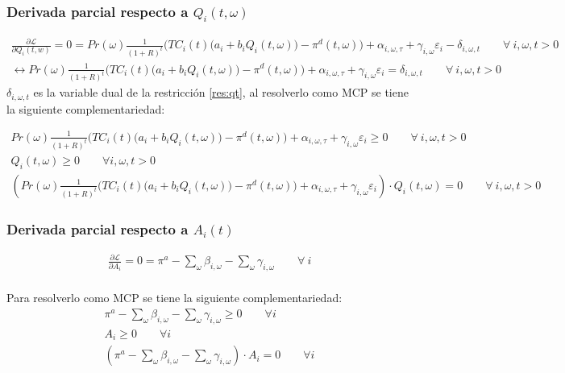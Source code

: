 \subsubsection{Derivada parcial respecto a $Q_i(t,\omega)$}
\footnotesize{
\begin{align}
   \frac{\partial \mathcal{L} }{\partial Q_i(t,w)}= 
   0= Pr(\omega)  \frac{1}{(1+R)^t} \bigg( TC_i(t) \big(a_{i}+b_i Q_i(t,\omega)\big ) -\pi^d(t,\omega) \bigg) + \alpha_{i,\omega,\tau} + \gamma_{i,\omega} \varepsilon_{i} -\delta_{i,\omega,t} \qquad  \forall \ i, \omega, t > 0\\
   \leftrightarrow Pr(\omega)  \frac{1}{(1+R)^t} \bigg( TC_i(t) \big(a_{i}+b_i Q_i(t,\omega)\big ) -\pi^d(t,\omega) \bigg) + \alpha_{i,\omega,\tau} + \gamma_{i,\omega} \varepsilon_{i}= \delta_{i,\omega,t} \qquad \forall \ i, \omega, t > 0
\end{align}
}
$\delta_{i,\omega,t}$ es la variable dual de la restricción \ref{res:qt}, al resolverlo como MCP se tiene la siguiente complementariedad:

\footnotesize{
\begin{align}
    Pr(\omega)  \frac{1}{(1+R)^t} \bigg( TC_i(t) \big(a_{i}+b_i Q_i(t,\omega)\big ) -\pi^d(t,\omega) \bigg) + \alpha_{i,\omega,\tau} + \gamma_{i,\omega} \varepsilon_{i} \geq 0 \qquad \forall \ i, \omega, t > 0\\
    Q_i(t,\omega) \geq 0 \qquad  \forall i, \omega, t > 0\\
    (Pr(\omega)  \frac{1}{(1+R)^t} \bigg( TC_i(t) \big(a_{i}+b_i Q_i(t,\omega)\big ) -\pi^d(t,\omega) \bigg) + \alpha_{i,\omega,\tau} + \gamma_{i,\omega} \varepsilon_{i})\cdot  Q_i(t,\omega)= 0 \qquad \forall \ i, \omega, t > 0
\end{align}
}

\subsubsection{Derivada parcial respecto a $A_i(t)$}
\footnotesize{
\begin{align}
   \frac{\partial \mathcal{L} }{\partial A_i}= 0
   = \pi^{a} - \sum_{\omega}\beta_{i,\omega} - \sum_{\omega}\gamma_{i,\omega}  \qquad \forall \  i \\
\end{align}
}

Para resolverlo como MCP se tiene la siguiente complementariedad:
\footnotesize{
\begin{align}
    \pi^{a} - \sum_{\omega}\beta_{i,\omega} - \sum_{\omega}\gamma_{i,\omega} \geq 0 \qquad \forall  i\\
    A_i \geq 0 \qquad \forall  i\\
    (\pi^{a} - \sum_{\omega}\beta_{i,\omega} - \sum_{\omega}\gamma_{i,\omega}) \cdot A_i = 0 \qquad \forall  i
\end{align}
}

